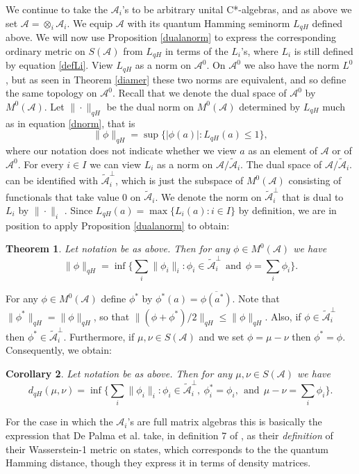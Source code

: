 \documentclass{amsart}[14pt]
\newtheorem{theorem}{Theorem}[section]
\newtheorem{corollary}[theorem]{Corollary}
\theoremstyle{definition}
\theoremstyle{remark}
\newcommand{\cA}{{\mathcal A}}
\newcommand{\<}{\langle}
\renewcommand{\>}{\rangle}
\numberwithin{equation}{section}
\begin{document}
{We continue to take the $\cA_i$'s  to be 
arbitrary unital C*-algebras, and as above we set 
$\cA = \otimes_i \cA_i $.
We equip $\cA$ with its quantum Hamming seminorm 
$L_{qH}$ defined above.
We will now use Proposition \ref{dualanorm} to 
express the corresponding ordinary metric on $S(\cA)$
from $L_{qH}$ in terms of the $L_i$'s, where $L_i$ is still defined
by equation \ref{defLi}.
View $L_{qH}$ as a norm
on $\cA^0$.
On $\cA^0$ we also have the norm $L^0$, but as seen in
Theorem \ref{diamer} these two norms are equivalent, and so define
the same topology on $\cA^0$. 
Recall that we denote the dual space of 
$\cA^0$ by $M^0(\cA)$. 
Let $\| \cdot \|_{qH}$ be the dual
norm on $M^0(\cA)$ determined  by $L_{qH}$
much as in equation \eqref{dnorm}, that is 
\[
\|\phi\|_{qH} = \sup \{|\phi(a)|: L_{qH}(a) \leq 1\}   ,
\]
where our notation does not indicate whether we view
$a$ as an element of $\cA$ or of $\cA^0$.
For every $i \in I$
we can view $L_i$ as a norm on $\cA/\tilde \cA_i$. 
The dual space of  $\cA/ \tilde \cA_i$.
can be identified with $\tilde \cA_i^\perp$, 
which is just the subspace of $M^0(\cA)$ consisting of functionals
that take value 0 on $\tilde \cA_i$. 
We denote the norm on $\tilde \cA_i^\perp$ that is
dual to $L_i$ by $\|\cdot \|_i$ . 
Since $L_{qH}(a) = \max\{L_i(a): i \in I\}$ by definition,
we are in position to apply Proposition \ref{dualanorm}
to obtain:

\begin{theorem}
Let notation be as above. Then for any $\phi \in M^0(\cA)$ we have 
\[
\|\phi\|_{qH} = \inf \{ \sum_i \|\phi_i\|_i : \phi_i \in \tilde \cA_i^\perp
\ \ \mathrm{and} \ \ \phi = \sum_i \phi_i \} .
\]
\end{theorem}

For any $\phi \in M^0(\cA)$ define $\phi^*$ by $\phi^*(a) = \overline{\phi(a^*)}$.
Note that $\|\phi^*\|_{qH} = \|\phi\|_{qH}$, 
so that  $\|(\phi + \phi^*)/2\|_{qH} \leq \|\phi\|_{qH}$.
Also, if $\phi \in \tilde \cA_i^\perp$ 
then $\phi^* \in \tilde \cA_i^\perp$.
Furthermore, if $\mu, \nu \in S(\cA)$ and we set 
$\phi = \mu - \nu$ then $\phi^* = \phi$.
Consequently, we obtain:  
\begin{corollary}
\label{stated}
Let notation be as above. Then 
for any $\mu, \nu \in S(\cA)$ we have
\[
d_{qH}(\mu, \nu) =  \inf \{ \sum_i \|\phi_i\|_i : \phi_i \in \tilde \cA_i^\perp,
\ \phi_i^* = \phi_i, \ \
 \mathrm{and} \ \ \mu - \nu = \sum_i \phi_i \} .
\]
\end{corollary}

For the case in which the $\cA_i$'s are full matrix algebras
this is basically the expression that  De Palma et al. take, in definition 7
of \cite{DMTL}, as their \emph{definition} of their
Wasserstein-1
metric on states, which  corresponds to the 
the quantum Hamming distance, 
though they express it in terms of density matrices.

}
\end{document}

